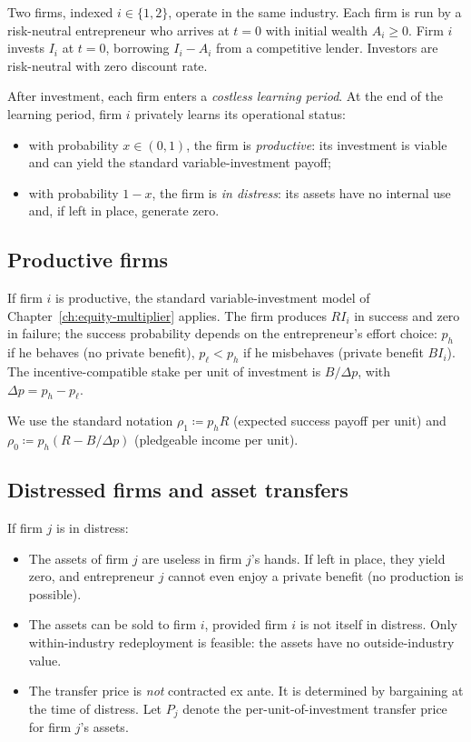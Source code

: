 \documentclass[11pt,a4paper,oneside]{book}
\def\geq{\geqslant}
\theoremstyle{plain}
\theoremstyle{definition}
\theoremstyle{remark}
\numberwithin{equation}{chapter}
\begin{document}
Two firms, indexed $i \in \{1, 2\}$, operate in the same industry.
Each firm is run by a risk-neutral entrepreneur who arrives at $t = 0$ with initial wealth $A_i \geq 0$.
Firm $i$ invests $I_i$ at $t = 0$, borrowing $I_i - A_i$ from a competitive lender.
Investors are risk-neutral with zero discount rate.

After investment, each firm enters a \emph{costless learning period}.
At the end of the learning period, firm $i$ privately learns its operational status:
\begin{itemize}
  \item with probability $x \in (0, 1)$, the firm is \emph{productive}: its investment is viable and can yield the standard variable-investment payoff;
  \item with probability $1 - x$, the firm is \emph{in distress}: its assets have no internal use and, if left in place, generate zero.
\end{itemize}

\subsection{Productive firms}

If firm $i$ is productive, the standard variable-investment model of Chapter~\ref{ch:equity-multiplier} applies.
The firm produces $R I_i$ in success and zero in failure; the success probability depends on the entrepreneur's effort choice: $p_h$ if he behaves (no private benefit), $p_\ell < p_h$ if he misbehaves (private benefit $B I_i$).
The incentive-compatible stake per unit of investment is $B/\Delta p$, with $\Delta p = p_h - p_\ell$.

We use the standard notation $\rho_1 \coloneqq p_h R$ (expected success payoff per unit) and $\rho_0 \coloneqq p_h(R - B/\Delta p)$ (pledgeable income per unit).

\subsection{Distressed firms and asset transfers}

If firm $j$ is in distress:
\begin{itemize}
  \item The assets of firm $j$ are useless in firm $j$'s hands.
  If left in place, they yield zero, and entrepreneur $j$ cannot even enjoy a private benefit (no production is possible).
  \item The assets can be sold to firm $i$, provided firm $i$ is not itself in distress.
  Only within-industry redeployment is feasible: the assets have no outside-industry value.
  \item The transfer price is \emph{not} contracted ex ante.
  It is determined by bargaining at the time of distress.
  Let $P_j$ denote the per-unit-of-investment transfer price for firm $j$'s assets.
\end{itemize}
\end{document}
